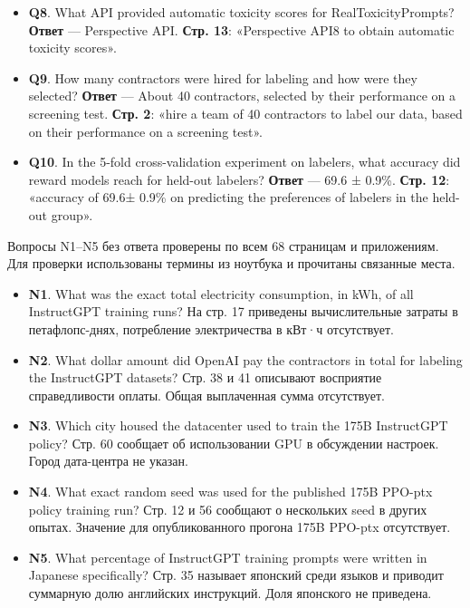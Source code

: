 \documentclass[12pt,a4paper]{article}
\providecommand{\tightlist}{\setlength{\itemsep}{0pt}\setlength{\parskip}{0pt}}
\begin{document}
\begin{itemize}
  response, it produces a reward determined by the reward model and ends
  the episode».
\item
  \textbf{Q8}. What API provided automatic toxicity scores for
  RealToxicityPrompts? \textbf{Ответ} --- Perspective API. \textbf{Стр.
  13}: «Perspective API8 to obtain automatic toxicity scores».
\item
  \textbf{Q9}. How many contractors were hired for labeling and how were
  they selected? \textbf{Ответ} --- About 40 contractors, selected by
  their performance on a screening test. \textbf{Стр. 2}: «hire a team
  of 40 contractors to label our data, based on their performance on a
  screening test».
\item
  \textbf{Q10}. In the 5-fold cross-validation experiment on labelers,
  what accuracy did reward models reach for held-out labelers?
  \textbf{Ответ} --- 69.6 ± 0.9\%. \textbf{Стр. 12}: «accuracy of 69.6±
  0.9\% on predicting the preferences of labelers in the held-out
  group».
\end{itemize}

Вопросы N1--N5 без ответа проверены по всем 68 страницам и приложениям.
Для проверки использованы термины из ноутбука и прочитаны связанные
места.

\begin{itemize}
\tightlist
\item
  \textbf{N1}. What was the exact total electricity consumption, in kWh,
  of all InstructGPT training runs? На стр. 17 приведены вычислительные
  затраты в петафлопс-днях, потребление электричества в кВт·ч
  отсутствует.
\item
  \textbf{N2}. What dollar amount did OpenAI pay the contractors in
  total for labeling the InstructGPT datasets? Стр. 38 и 41 описывают
  восприятие справедливости оплаты. Общая выплаченная сумма отсутствует.
\item
  \textbf{N3}. Which city housed the datacenter used to train the 175B
  InstructGPT policy? Стр. 60 сообщает об использовании GPU в обсуждении
  настроек. Город дата-центра не указан.
\item
  \textbf{N4}. What exact random seed was used for the published 175B
  PPO-ptx policy training run? Стр. 12 и 56 сообщают о нескольких seed в
  других опытах. Значение для опубликованного прогона 175B PPO-ptx
  отсутствует.
\item
  \textbf{N5}. What percentage of InstructGPT training prompts were
  written in Japanese specifically? Стр. 35 называет японский среди
  языков и приводит суммарную долю английских инструкций. Доля японского
  не приведена.
\end{itemize}
\end{document}
